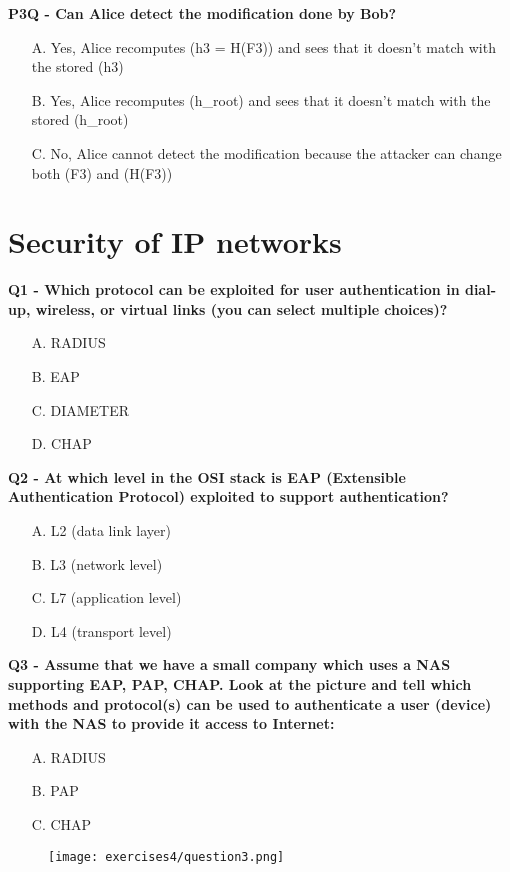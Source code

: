 \textbf{P3Q - Can Alice detect the modification done by Bob?}
\begin{itemize}
    \item[A.] Yes, Alice recomputes (h3 = H(F3)) and sees that it doesn’t match with the stored (h3)
    \item[B.] Yes, Alice recomputes (h_{root}) and sees that it doesn’t match with the stored (h_{root})
    \item[C.] No, Alice cannot detect the modification because the attacker can change both (F3) and (H(F3))
\end{itemize}


\section*{Security of IP networks}
\textbf{Q1 - Which protocol can be exploited for user authentication in dial-up, wireless, or virtual links (you can select multiple choices)?}
\begin{itemize}
    \item[A.] RADIUS
    \item[B.] EAP
    \item[C.] DIAMETER
    \item[D.] CHAP
\end{itemize}

\textbf{Q2 - At which level in the OSI stack is EAP (Extensible Authentication Protocol) exploited to support authentication?}
\begin{itemize}
    \item[A.] L2 (data link layer)
    \item[B.] L3 (network level)
    \item[C.] L7 (application level)
    \item[D.] L4 (transport level)
\end{itemize}

\textbf{Q3 - Assume that we have a small company which uses a NAS supporting EAP, PAP, CHAP. Look at the picture and tell which methods and protocol(s) can be used to authenticate a user (device) with the NAS to provide it access to Internet:}
\begin{itemize}
    \item[A.] RADIUS
    \item[B.] PAP
    \item[C.] CHAP
\end{itemize}
\begin{figure}[h]
    \centering
    \texttt{[image: exercises4/question3.png]}
\end{figure}
  
